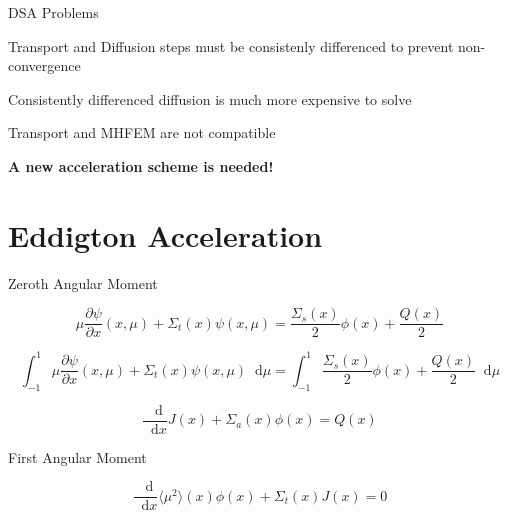 \documentclass[10pt]{beamer}
\newcommand{\ud}{\mathop{}\!\mathrm{d}} %
\newcommand{\pderiv}[2]{\frac{\partial #1}{\partial #2}}
\newcommand{\dderiv}[2]{\frac{\ud #1}{\ud #2}}
\newcommand{\edd}{\langle \mu^2 \rangle}
\begin{document}
\begin{frame}{DSA Problems}

    Transport and Diffusion steps must be consistenly differenced to prevent non-convergence 

    Consistently differenced diffusion is much more expensive to solve 

    Transport and MHFEM are not compatible

    \textbf{A new acceleration scheme is needed!}

\end{frame}

\section{Eddigton Acceleration}

\begin{frame}{Zeroth Angular Moment}


    \begin{equation*}
        \mu \pderiv{\psi}{x}(x, \mu) + \Sigma_t(x) \psi(x,\mu) = 
        \frac{\Sigma_s(x)}{2} \phi(x) + \frac{Q(x)}{2}
    \end{equation*}

    \begin{equation*}
        \int_{-1}^{1} \mu \pderiv{\psi}{x}(x, \mu) + 
            \Sigma_t(x) \psi(x,\mu) \ud \mu = 
        \int_{-1}^{1} \frac{\Sigma_s(x)}{2} \phi(x) + \frac{Q(x)}{2} \ud \mu
    \end{equation*}

    \begin{equation*}
        \dderiv{}{x} J(x) + \Sigma_a(x) \phi(x) = Q(x)
    \end{equation*}

\end{frame}

\begin{frame}{First Angular Moment}
    
    \begin{equation*}
        \frac{\ud}{\ud x} \edd(x) \phi(x) + \Sigma_t(x) J(x) = 0 
    \end{equation*}

\end{frame}
\end{document}
